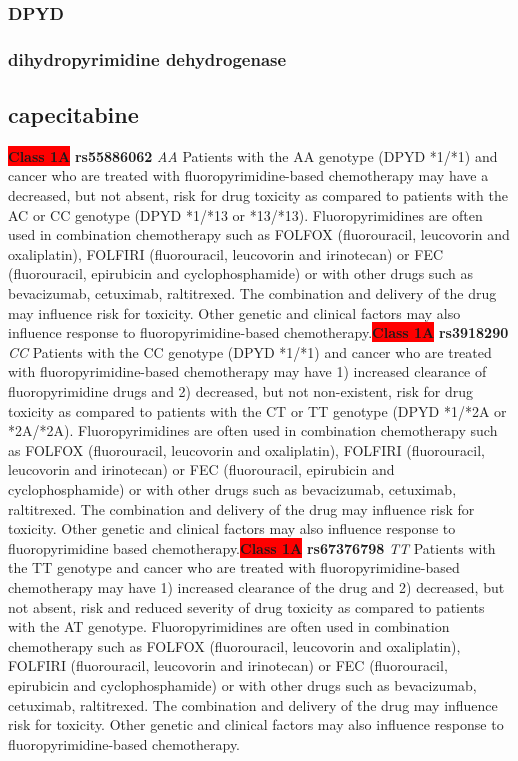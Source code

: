 \documentclass{book}
\begin{document}
\subsubsection{ DPYD }
\subsubsection{ dihydropyrimidine dehydrogenase }

\subsection{ capecitabine }


\begin{center}
\textbf{\colorbox{red} {Class 1A}} \textbf{ rs55886062 } \textit{ AA }
Patients with the AA genotype (DPYD *1/*1) and cancer who are treated with fluoropyrimidine-based chemotherapy may have a decreased, but not absent, risk for drug toxicity as compared to patients with the AC or CC genotype (DPYD *1/*13 or *13/*13). Fluoropyrimidines are often used in combination chemotherapy such as FOLFOX (fluorouracil, leucovorin and oxaliplatin), FOLFIRI (fluorouracil, leucovorin and irinotecan) or FEC (fluorouracil, epirubicin and cyclophosphamide) or with other drugs such as bevacizumab, cetuximab, raltitrexed. The combination and delivery of the drug may influence risk for toxicity. Other genetic and clinical factors may also influence response to fluoropyrimidine-based chemotherapy.\textbf{\colorbox{red} {Class 1A}} \textbf{ rs3918290 } \textit{ CC }
Patients with the CC genotype (DPYD *1/*1) and cancer who are treated with fluoropyrimidine-based chemotherapy may have 1) increased clearance of fluoropyrimidine drugs and 2) decreased, but not non-existent, risk for drug toxicity as compared to patients with the CT or TT genotype (DPYD *1/*2A or *2A/*2A). Fluoropyrimidines are often used in combination chemotherapy such as FOLFOX (fluorouracil, leucovorin and oxaliplatin), FOLFIRI (fluorouracil,  leucovorin and irinotecan) or FEC (fluorouracil, epirubicin and cyclophosphamide) or with other drugs such as bevacizumab, cetuximab, raltitrexed. The combination and delivery of the drug may influence risk for toxicity. Other genetic and clinical factors may also influence response to fluoropyrimidine based chemotherapy.\textbf{\colorbox{red} {Class 1A}} \textbf{ rs67376798 } \textit{ TT }
Patients with the TT genotype and cancer who are treated with fluoropyrimidine-based chemotherapy may have 1) increased clearance of the drug and 2) decreased, but not absent, risk and reduced severity of drug toxicity as compared to patients with the AT genotype. Fluoropyrimidines are often used in combination chemotherapy such as FOLFOX (fluorouracil, leucovorin and oxaliplatin), FOLFIRI (fluorouracil, leucovorin and irinotecan) or FEC (fluorouracil, epirubicin and cyclophosphamide) or with other drugs such as bevacizumab, cetuximab, raltitrexed. The combination and delivery of the drug may influence risk for toxicity. Other genetic and clinical factors may also influence response to fluoropyrimidine-based chemotherapy.




\end{center}
\end{document}

